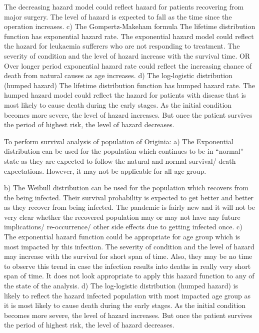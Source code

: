 \documentclass[a4paper,12pt]{article}
\begin{document}
The decreasing hazard model could reflect hazard for patients recovering from major surgery. The
level of hazard is expected to fall as the time since the operation increases. 
c) The Gompertz-Makeham formula 
The lifetime distribution function has exponential hazard rate. 
The exponential hazard model could reflect the hazard for leukaemia sufferers who are not
responding to treatment. The severity of condition and the level of hazard increase with the survival
time. OR Over longer period exponential hazard rate could reflect the increasing chance of death
from natural causes as age increases. 
d) The log-logistic distribution (humped hazard) 
The lifetime distribution function has humped hazard rate. 
The humped hazard model could reflect the hazard for patients with disease that is most likely to
cause death during the early stages. As the initial condition becomes more severe, the level of
hazard increases. But once the patient survives the period of highest risk, the level of hazard
decreases. 

\newpage 

To perform survival analysis of population of Originia:
a) The Exponential distribution can be used for the population which continues to be in “normal”
state as they are expected to follow the natural and normal survival/ death expectations.
However, it may not be applicable for all age group.

b) The Weibull distribution can be used for the population which recovers from the being infected.
Their survival probability is expected to get better and better as they recover from being
infected. The pandemic is fairly new and it will not be very clear whether the recovered
population may or may not have any future implications/ re-occurrence/ other side effects due
to getting infected once.
c) The exponential hazard function could be appropriate for age group which is most impacted by
this infection. The severity of condition and the level of hazard may increase with the survival
for short span of time. Also, they may be no time to observe this trend in case the infection
results into deaths in really very short span of time. It does not look appropriate to apply this
hazard function to any of the state of the analysis.
d) The log-logistic distribution (humped hazard) is likely to reflect the hazard infected population
with most impacted age group as it is most likely to cause death during the early stages. As the
initial condition becomes more severe, the level of hazard increases. But once the patient
survives the period of highest risk, the level of hazard decreases.

\end{document}
